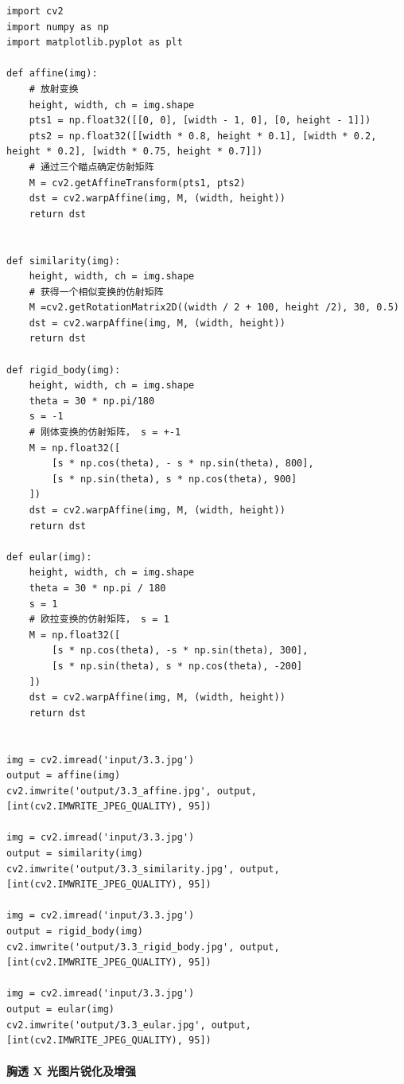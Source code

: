 \documentclass[11pt]{ctexart}
\begin{document}
\lstset{language=python}
\begin{lstlisting}
import cv2
import numpy as np
import matplotlib.pyplot as plt

def affine(img):
	# 放射变换
	height, width, ch = img.shape
	pts1 = np.float32([[0, 0], [width - 1, 0], [0, height - 1]])
	pts2 = np.float32([[width * 0.8, height * 0.1], [width * 0.2, height * 0.2], [width * 0.75, height * 0.7]])
	# 通过三个瞄点确定仿射矩阵
	M = cv2.getAffineTransform(pts1, pts2)
	dst = cv2.warpAffine(img, M, (width, height))
	return dst


def similarity(img):
	height, width, ch = img.shape
	# 获得一个相似变换的仿射矩阵
	M =cv2.getRotationMatrix2D((width / 2 + 100, height /2), 30, 0.5)
	dst = cv2.warpAffine(img, M, (width, height))
	return dst

def rigid_body(img):
	height, width, ch = img.shape
	theta = 30 * np.pi/180
	s = -1
	# 刚体变换的仿射矩阵， s = +-1
	M = np.float32([
		[s * np.cos(theta), - s * np.sin(theta), 800],
		[s * np.sin(theta), s * np.cos(theta), 900]
	])
	dst = cv2.warpAffine(img, M, (width, height))
	return dst

def eular(img):
	height, width, ch = img.shape
	theta = 30 * np.pi / 180
	s = 1
	# 欧拉变换的仿射矩阵， s = 1
	M = np.float32([
		[s * np.cos(theta), -s * np.sin(theta), 300],
		[s * np.sin(theta), s * np.cos(theta), -200]
	])
	dst = cv2.warpAffine(img, M, (width, height))
	return dst


img = cv2.imread('input/3.3.jpg')
output = affine(img)
cv2.imwrite('output/3.3_affine.jpg', output, [int(cv2.IMWRITE_JPEG_QUALITY), 95])

img = cv2.imread('input/3.3.jpg')
output = similarity(img)
cv2.imwrite('output/3.3_similarity.jpg', output, [int(cv2.IMWRITE_JPEG_QUALITY), 95])

img = cv2.imread('input/3.3.jpg')
output = rigid_body(img)
cv2.imwrite('output/3.3_rigid_body.jpg', output, [int(cv2.IMWRITE_JPEG_QUALITY), 95])

img = cv2.imread('input/3.3.jpg')
output = eular(img)
cv2.imwrite('output/3.3_eular.jpg', output, [int(cv2.IMWRITE_JPEG_QUALITY), 95])
\end{lstlisting}

\paragraph{胸透 X 光图片锐化及增强}
\end{document}
